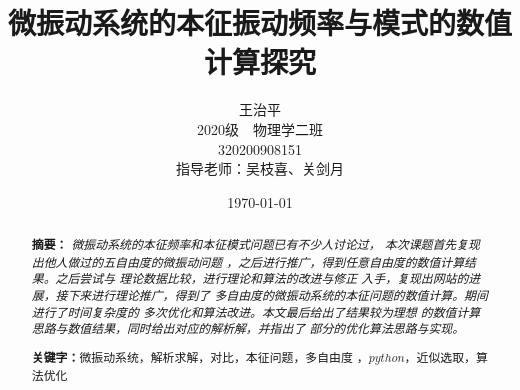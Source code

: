 \documentclass[11pt, a4paper, oneside]{ctexart}
\title{\textbf{微振动系统的本征振动频率与模式的数值计算探究
}}
\author{{王治平} 
\\\vspace{-6mm}
\small{2020级\ \ 物理学二班}
\\\small{320200908151}
\\{指导老师：吴枝喜、关剑月}}
\date{\today}
\begin{document}
\maketitle
	

    \maketitle

    \setcounter{page}{0}
    \maketitle
    \thispagestyle{empty}
    ~\\~\\~\\

\maketitle

\setcounter{page}{0}
\maketitle
\thispagestyle{empty}

\begin{abstract}
    {\setlength{\parindent}{0em}\textbf{摘要：}\emph{
    微振动系统的本征频率和本征模式问题已有不少人讨论过，
    本次课题首先复现出他人做过的五自由度的微振动问题
    ，之后进行推广，得到任意自由度的数值计算结果。之后尝试与
    理论数据比较，进行理论和算法的改进与修正
    入手，复现出网站的进展，接下来进行理论推广，得到了
    多自由度的微振动系统的本征问题的数值计算。期间进行了时间复杂度的
    多次优化和算法改进。本文最后给出了结果较为理想
    的数值计算思路与数值结果，同时给出对应的解析解，并指出了
    部分的优化算法思路与实现。
    }


    }
    \vspace{6mm}
    \setlength{\parindent}{2em}\textbf{关键字：}{微振动系统，解析求解，对比，本征问题，多自由度
    ，$python$，近似选取，算法优化}
\end{abstract}
\end{document}
